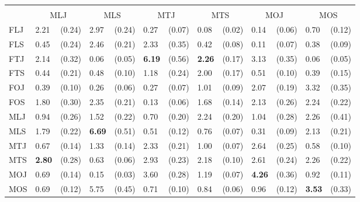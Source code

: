 \begin{tabular}{ll@{\,\,\,}rl@{\,\,\,}rl@{\,\,\,}rl@{\,\,\,}rl@{\,\,\,}rl@{\,\,\,}r}
\phantom{\textbf{Receiver}} &\\
    & \multicolumn{2}{c}{\textnormal{MLJ}}
    & \multicolumn{2}{c}{\textnormal{MLS}}
    & \multicolumn{2}{c}{\textnormal{MTJ}}
    & \multicolumn{2}{c}{\textnormal{MTS}}
    & \multicolumn{2}{c}{\textnormal{MOJ}}
    & \multicolumn{2}{c}{\textnormal{MOS}} \\
    \cmidrule(lr){2-3}
    \cmidrule(lr){4-5}
    \cmidrule(lr){6-7}
    \cmidrule(lr){8-9}
    \cmidrule(lr){10-11}
    \cmidrule(lr){12-13}
    \textnormal{FLJ} & 2.21 & (0.24) & 2.97 & (0.24) & 0.27 & (0.07) & 0.08 & (0.02) & 0.14 & (0.06) & 0.70 & (0.12) \\
    \textnormal{FLS} & 0.45 & (0.24) & 2.46 & (0.21) & 2.33 & (0.35) & 0.42 & (0.08) & 0.11 & (0.07) & 0.38 & (0.09) \\
    \textnormal{FTJ} & 2.14 & (0.32) & 0.06 & (0.05) & \textbf{6.19} & (0.56) & \textbf{2.26} & (0.17) & 3.13 & (0.35) & 0.06 & (0.05) \\
    \textnormal{FTS} & 0.44 & (0.21) & 0.48 & (0.10) & 1.18 & (0.24) & 2.00 & (0.17) & 0.51 & (0.10) & 0.39 & (0.15) \\
    \textnormal{FOJ} & 0.39 & (0.10) & 0.26 & (0.06) & 0.27 & (0.07) & 1.01 & (0.09) & 2.07 & (0.19) & 3.32 & (0.35) \\
    \textnormal{FOS} & 1.80 & (0.30) & 2.35 & (0.21) & 0.13 & (0.06) & 1.68 & (0.14) & 2.13 & (0.26) & 2.24 & (0.22) \\
    \textnormal{MLJ} & 0.94 & (0.26) & 1.52 & (0.22) & 0.70 & (0.20) & 2.24 & (0.20) & 1.04 & (0.28) & 2.26 & (0.41) \\
    \textnormal{MLS} & 1.79 & (0.22) & \textbf{6.69} & (0.51) & 0.51 & (0.12) & 0.76 & (0.07) & 0.31 & (0.09) & 2.13 & (0.21) \\
    \textnormal{MTJ} & 0.67 & (0.14) & 1.33 & (0.14) & 2.33 & (0.21) & 1.00 & (0.07) & 2.64 & (0.25) & 0.58 & (0.10) \\
    \textnormal{MTS} & \textbf{2.80} & (0.28) & 0.63 & (0.06) & 2.93 & (0.23) & 2.18 & (0.10) & 2.61 & (0.24) & 2.26 & (0.22) \\
    \textnormal{MOJ} & 0.69 & (0.14) & 0.15 & (0.03) & 3.60 & (0.28) & 1.19 & (0.07) & \textbf{4.26} & (0.36) & 0.92 & (0.11) \\
    \textnormal{MOS} & 0.69 & (0.12) & 5.75 & (0.45) & 0.71 & (0.10) & 0.84 & (0.06) & 0.96 & (0.12) & \textbf{3.53} & (0.33) \\
\bottomrule
\end{tabular}
